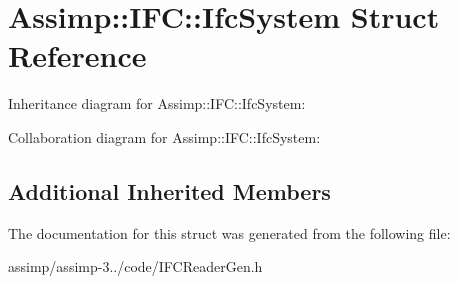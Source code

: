 \hypertarget{struct_assimp_1_1_i_f_c_1_1_ifc_system}{\section{Assimp\+:\+:I\+F\+C\+:\+:Ifc\+System Struct Reference}
\label{struct_assimp_1_1_i_f_c_1_1_ifc_system}
}


Inheritance diagram for Assimp\+:\+:I\+F\+C\+:\+:Ifc\+System\+:


Collaboration diagram for Assimp\+:\+:I\+F\+C\+:\+:Ifc\+System\+:
\subsection*{Additional Inherited Members}


The documentation for this struct was generated from the following file\+:\begin{DoxyCompactItemize}
\item 
assimp/assimp-\/3../code/I\+F\+C\+Reader\+Gen.\+h\end{DoxyCompactItemize}
